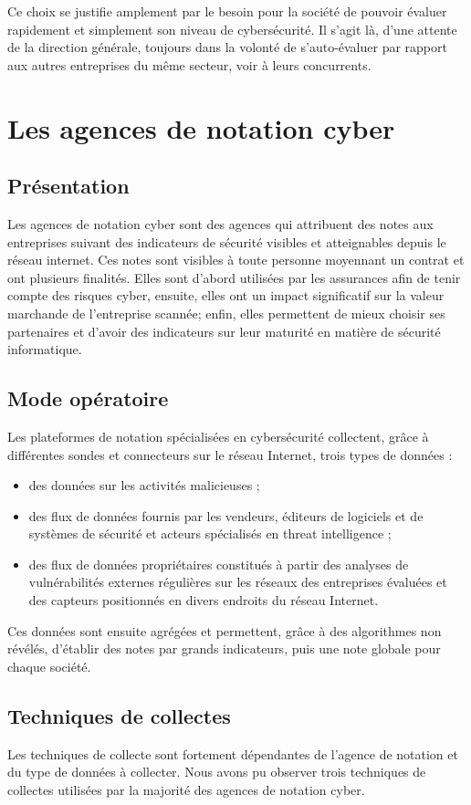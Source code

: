\documentclass[a4paper,12pt]{book}
\theoremstyle{break}
\begin{document}
Ce choix se justifie amplement par le besoin pour la société de pouvoir évaluer rapidement et simplement son niveau de cybersécurité. Il s’agit là, d’une attente de la direction générale, toujours dans la volonté de s'auto-évaluer par rapport aux autres entreprises du même secteur, voir à leurs concurrents. 

\section{Les agences de notation cyber}
\subsection{Présentation}
Les agences de notation cyber sont des agences qui attribuent des notes aux entreprises suivant des indicateurs de sécurité visibles et atteignables depuis le réseau internet. 
Ces notes sont visibles à toute personne moyennant un contrat et ont plusieurs finalités. Elles sont d'abord utilisées par les assurances afin de tenir compte des risques cyber, ensuite, elles ont un impact significatif sur la valeur marchande de l'entreprise scannée;  enfin, elles permettent de mieux choisir ses partenaires et d'avoir des indicateurs sur leur maturité en matière de sécurité informatique. 


\subsection{Mode opératoire}
Les plateformes de notation spécialisées en cybersécurité collectent, grâce à différentes sondes et connecteurs sur le réseau Internet, trois types de données :
\begin{itemize}
    \item des données sur les activités malicieuses ; 
    \item des flux de données fournis par les vendeurs, éditeurs de logiciels et de systèmes de sécurité et acteurs spécialisés en threat intelligence ; 
    \item des flux de données propriétaires constitués à partir des analyses de vulnérabilités externes régulières sur les réseaux des entreprises évaluées et des capteurs positionnés en divers endroits du réseau Internet.
\end{itemize}
Ces données sont ensuite agrégées et permettent, grâce à des algorithmes non révélés, d’établir des notes par grands indicateurs, puis une note globale pour chaque société. 
\subsection{Techniques de collectes}
Les techniques de collecte sont fortement dépendantes de l'agence de notation et du type de données à collecter. Nous avons pu observer trois techniques de collectes utilisées par la majorité des agences de notation cyber. 
\end{document}
